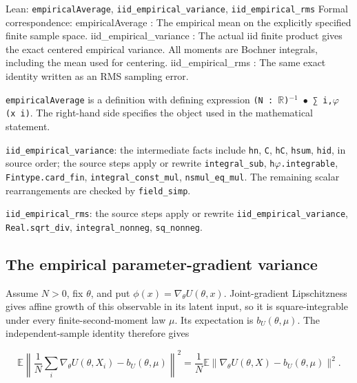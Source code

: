 \documentclass[11pt,a4paper]{report}
\begin{document}
\begin{leanbox}{Lean: \texttt{empiricalAverage}, \texttt{iid\_\allowbreak{}empirical\_\allowbreak{}variance}, \texttt{iid\_\allowbreak{}empirical\_\allowbreak{}rms}}
Formal correspondence: empiricalAverage : The empirical mean on the explicitly specified finite sample space. iid\_empirical\_variance : The actual iid finite product gives the exact centered empirical variance. All moments are Bochner integrals, including the mean used for centering. iid\_empirical\_rms : The same exact identity written as an RMS sampling error.



\texttt{empirical\allowbreak{}Average} is a definition with defining expression \texttt{(N : \ensuremath{\mathbb R})\ensuremath{{}^{-1}} \ensuremath{\bullet} ∑ i,\ensuremath{\varphi} (x i)}. The right-hand side specifies the object used in the mathematical statement.



\texttt{iid\_\allowbreak{}empirical\_\allowbreak{}variance}: the intermediate facts include \texttt{hn}, \texttt{C}, \texttt{h\allowbreak{}C}, \texttt{hsum}, \texttt{hid}, in source order; the source steps apply or rewrite \texttt{integral\_\allowbreak{}sub}, \texttt{h\ensuremath{\varphi}.\allowbreak{}integrable}, \texttt{Fintype.\allowbreak{}card\_\allowbreak{}fin}, \texttt{integral\_\allowbreak{}const\_\allowbreak{}mul}, \texttt{nsmul\_\allowbreak{}eq\_\allowbreak{}mul}. The remaining scalar rearrangements are checked by \texttt{field\_\allowbreak{}simp}.



\texttt{iid\_\allowbreak{}empirical\_\allowbreak{}rms}: the source steps apply or rewrite \texttt{iid\_\allowbreak{}empirical\_\allowbreak{}variance}, \texttt{Real.\allowbreak{}sqrt\_\allowbreak{}div}, \texttt{integral\_\allowbreak{}nonneg}, \texttt{sq\_\allowbreak{}nonneg}.
\end{leanbox}
\subsection{\texorpdfstring{The empirical parameter-gradient variance}{The empirical parameter-gradient variance}}
\label{report-step-ProximalLangevin-MeanFieldVariance-lean-3}


Assume \(N>0\), fix \(\theta\), and put \(\phi(x)=\nabla_\theta U(\theta,x)\). Joint-gradient Lipschitzness gives affine growth of this observable in its latent input, so it is square-integrable under every finite-second-moment law \(\mu\). Its expectation is \(b_U(\theta,\mu)\). The independent-sample identity therefore gives

\[\mathbb E\left\|\frac1N\sum_i\nabla_\theta U(\theta,X_i)-b_U(\theta,\mu)\right\|^2=\frac1N\mathbb E\|\nabla_\theta U(\theta,X)-b_U(\theta,\mu)\|^2.\]
\end{document}
